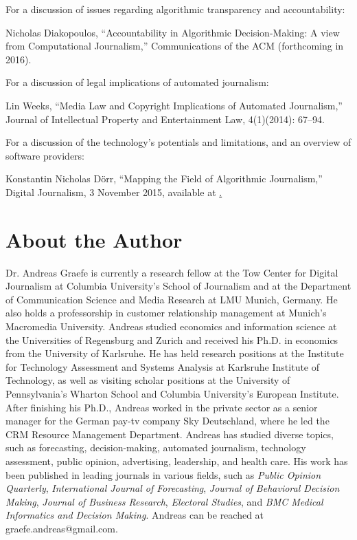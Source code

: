 \documentclass[notoc, symmetric, nobib, nols]{towcenter-book}
\begin{document}
For a discussion of issues regarding algorithmic transparency and accountability:

Nicholas Diakopoulos, ``Accountability in Algorithmic Decision-Making: A view from Computational Journalism,'' Communications of the ACM (forthcoming in 2016).   

For a discussion of legal implications of automated journalism:

Lin Weeks, ``Media Law and Copyright Implications of Automated Journalism,'' Journal of Intellectual Property and Entertainment Law, 4(1)(2014): 67--94.

For a discussion of the technology’s potentials and limitations, and an overview of software providers:

Konstantin Nicholas Dörr, ``Mapping the Field of Algorithmic Journalism,'' Digital Journalism, 3 November 2015, available at \href{http://www.tandfonline.com/doi/abs/10.1080/21670811.2015.1096748?journalCode=rdij20}.

\chapter{About the Author}

Dr. Andreas Graefe is currently a research fellow at the Tow Center for Digital Journalism at Columbia University’s School of Journalism and at the Department of Communication Science and Media Research at LMU Munich, Germany. He also holds a professorship in customer relationship management at Munich’s Macromedia University. Andreas studied economics and information science at the Universities of Regensburg and Zurich and received his Ph.D. in economics from the University of Karlsruhe. He has held research positions at the Institute for Technology Assessment and Systems Analysis at Karlsruhe Institute of Technology, as well as visiting scholar positions at the University of Pennsylvania’s Wharton School and Columbia University’s European Institute. After finishing his Ph.D., Andreas worked in the private sector as a senior manager for the German pay-tv company Sky Deutschland, where he led the CRM Resource Management Department. Andreas has studied diverse topics, such as forecasting, decision-making, automated journalism, technology assessment, public opinion, advertising, leadership, and health care. His work has been published in leading journals in various fields, such as \textit{Public Opinion Quarterly}, \textit{International Journal of Forecasting}, \textit{Journal of Behavioral Decision Making}, \textit{Journal of Business Research}, \textit{Electoral Studies}, and \textit{BMC Medical Informatics and Decision Making}. Andreas can be reached at graefe.andreas@gmail.com.

 
\end{document}

